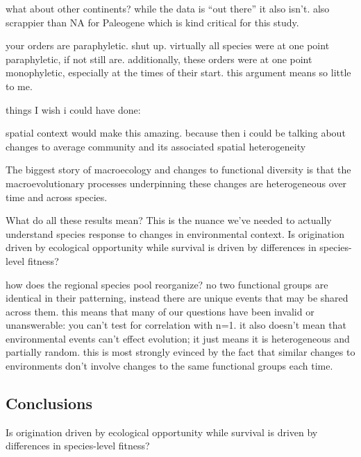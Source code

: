 \documentclass[12pt,letterpaper]{article}
\begin{document}
what about other continents? while the data is ``out there'' it also isn't. also scrappier than NA for Paleogene which is kind critical for this study.

your orders are paraphyletic. shut up. virtually all species were at one point paraphyletic, if not still are. additionally, these orders were at one point monophyletic, especially at the times of their start. this argument means so little to me.



things I wish i could have done:

spatial context would make this amazing. because then i could be talking about changes to average community and its associated spatial heterogeneity







The biggest story of macroecology and changes to functional diversity is that the macroevolutionary processes underpinning these changes are heterogeneous over time and across species. 

What do all these results mean? This is the nuance we've needed to actually understand species response to changes in environmental context. Is origination driven by ecological opportunity while survival is driven by differences in species-level fitness?

how does the regional species pool reorganize? no two functional groups are identical in their patterning, instead there are unique events that may be shared across them. this means that many of our questions have been invalid or unanswerable: you can't test for correlation with n=1. it also doesn't mean that environmental events can't effect evolution; it just means it is heterogeneous and partially random. this is most strongly evinced by the fact that similar changes to environments don't involve changes to the same functional groups each time.






\subsection*{Conclusions}

Is origination driven by ecological opportunity while survival is driven by differences in species-level fitness?
\end{document}
